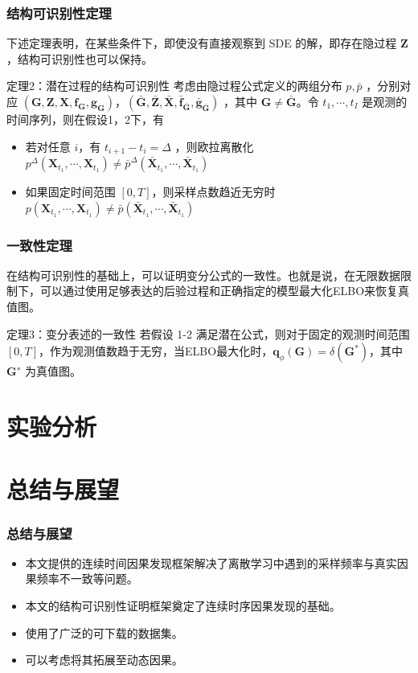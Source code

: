\documentclass{beamer}
\begin{document}
\begin{frame}
\frametitle{结构可识别性定理}
下述定理表明，在某些条件下，即使没有直接观察到 SDE 的解，即存在隐过程 $\boldsymbol Z$，结构可识别性也可以保持。
\begin{block}{定理2：潜在过程的结构可识别性}
考虑由隐过程公式定义的两组分布 $p,\bar p$ ，分别对应 $(\boldsymbol G,\boldsymbol Z,\boldsymbol X,\boldsymbol f_{\boldsymbol G},\boldsymbol g_{\boldsymbol G})$，$(\bar {\boldsymbol G},\bar {\boldsymbol Z},\bar {\boldsymbol X},\bar {\boldsymbol f}_{\bar {\boldsymbol G}},\bar {\boldsymbol g}_{\bar {\boldsymbol G}})$ ，其中 $\boldsymbol G\ne\bar {\boldsymbol G}$。令 $t_1,\cdots,t_I$ 是观测的时间序列，则在假设1，2下，有
\begin{itemize}
    \item 若对任意 $i$，有 $t_{i+1}-t_i=\Delta$ ，则欧拉离散化 $p^{\Delta}(\boldsymbol X_{t_{1}},\cdots,\boldsymbol X_{t_{1}})\neq\bar{p}^{\Delta}(\bar{\boldsymbol X}_{t_{1}},\cdots,\bar{\boldsymbol X}_{t_{1}})$
    \item 如果固定时间范围 $[0,T]$，则采样点数趋近无穷时 $p(\boldsymbol X_{t_{1}},\cdots,\boldsymbol X_{t_{1}})\neq\bar{p}(\bar{\boldsymbol X}_{t_{1}},\cdots,\bar{\boldsymbol X}_{t_{1}})$ 
\end{itemize}
\end{block}
\end{frame}

\begin{frame}
\frametitle{一致性定理}
在结构可识别性的基础上，可以证明变分公式的一致性。也就是说，在无限数据限制下，可以通过使用足够表达的后验过程和正确指定的模型最大化ELBO来恢复真值图。
\begin{block}{定理3：变分表述的一致性}
    若假设 1-2 满足潜在公式，则对于固定的观测时间范围 $[0,T]$，作为观测值数趋于无穷，当ELBO最大化时，$\boldsymbol q_\phi(\boldsymbol G)=\delta(\boldsymbol G^*)$，其中 $\boldsymbol G^∗$ 为真值图。
\end{block}
\end{frame}


\section{实验分析}


    
\section{总结与展望}
\begin{frame}
\frametitle{总结与展望}
\begin{itemize}
    \item 本文提供的连续时间因果发现框架解决了离散学习中遇到的采样频率与真实因果频率不一致等问题。
    \item 本文的结构可识别性证明框架奠定了连续时序因果发现的基础。
    \item 使用了广泛的可下载的数据集。
    \item 可以考虑将其拓展至动态因果。
\end{itemize}
\end{frame}
\end{document}
